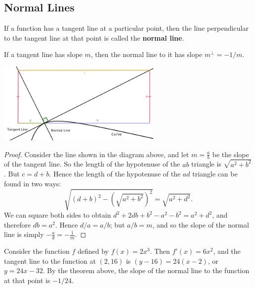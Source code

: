 \subsection*{Normal Lines}
If a function has a tangent line at a particular point, then the line perpendicular to the tangent line
at that point is called the \textbf{normal line}.

\begin{thm}
  If a tangent line has slope $ m $, then the normal line to it has slope $ m^\perp = -1/m $.
\end{thm}

\begin{center}
  \includegraphics[width=0.6\textwidth]{normal-line-proof}
\end{center}

\begin{proof}
  Consider the line shown in the diagram above, and let $ m = \frac{a}{b} $ be the slope of the tangent line.
  So the length of the hypotenuse of the $ ab $ triangle is $ \sqrt{a^2 + b^2} $. But $ c = d + b $. Hence the length
  of the hypotenuse of the $ ad $ triangle can be found in two ways:
  \begin{displaymath}
    \sqrt{(d + b)^2 - \left(\sqrt{a^2 + b^2}\right)^2} = \sqrt{a^2 + d^2}.
  \end{displaymath}
  We can square both sides to obtain $ d^2 + 2db + b^2 - a^2 - b^2 = a^2 + d^2 $, and therefore $ db = a^2 $.
  Hence $ d/a = a/b $; but $ a/b = m $, and so the slope of the normal line is simply $ -\frac{a}{d} = -\frac{1}{m} $.
\end{proof}

\begin{ex}
  Consider the function $ f $ defined by $ f(x) = 2x^3 $. Then $ f'(x) = 6x^2 $, and the tangent line
  to the function at $ (2, 16) $ is $ (y - 16) = 24(x - 2) $, or $ y = 24x - 32 $. By the theorem above,
  the slope of the normal line to the function at that point is $ -1/24 $.

  \begin{center}
  \end{center}
\end{ex}

